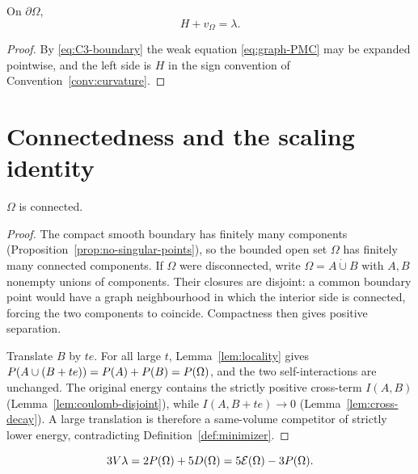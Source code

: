 \begin{corollary}\label{cor:EL-pointwise}
On $\partial\Omega$,
\begin{equation}\label{eq:EL-pointwise}
  H+v_\Omega=\lambda .
\end{equation}
\end{corollary}

\begin{proof}
By \eqref{eq:C3-boundary} the weak equation \eqref{eq:graph-PMC} may be
expanded pointwise, and the left side is $H$ in the sign convention of
Convention~\ref{conv:curvature}.
\end{proof}

\section{Connectedness and the scaling identity}

\begin{proposition}[Connectedness]\label{prop:connected}
$\Omega$ is connected.
\end{proposition}

\begin{proof}
The compact smooth boundary has finitely many components
(Proposition~\ref{prop:no-singular-points}), so the bounded open set $\Omega$
has finitely many connected components.  If $\Omega$ were disconnected, write
$\Omega=A\mathbin{\dot\cup}B$ with $A,B$ nonempty unions of components.  Their
closures are disjoint: a common boundary point would have a graph neighbourhood
in which the interior side is connected, forcing the two components to
coincide.  Compactness then gives positive separation.

Translate $B$ by $te$.  For all large $t$, Lemma~\ref{lem:locality} gives
$P(A\cup(B+te))=P(A)+P(B)=P(\Omega)$, and the two
self-interactions are unchanged.  The original energy contains the strictly
positive cross-term $I(A,B)$ (Lemma~\ref{lem:coulomb-disjoint}), while
$I(A,B+te)\to0$ (Lemma~\ref{lem:cross-decay}).  A large translation is
therefore a same-volume competitor of strictly lower energy, contradicting
Definition~\ref{def:minimizer}.
\end{proof}

\begin{proposition}\label{prop:scaling-identity}
\begin{equation}\label{eq:scaling-identity}
  3V\lambda=2P(\Omega)+5D(\Omega)
  =5\mathcal E(\Omega)-3P(\Omega).
\end{equation}
\end{proposition}

